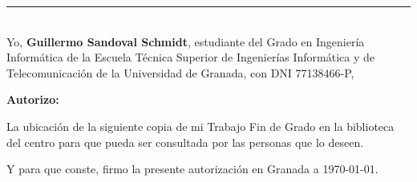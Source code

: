 \thispagestyle{empty}

\noindent\rule[-1ex]{\textwidth}{1pt}\\[4.5ex]

Yo, \textbf{Guillermo Sandoval Schmidt}, estudiante del Grado en Ingeniería Informática de la Escuela Técnica Superior de Ingenierías Informática y de Telecomunicación de la Universidad de Granada, con DNI
77138466-P,

\vspace{0.5cm}

\textbf{Autorizo:}

\vspace{0.5cm}

La ubicación de la siguiente copia de mi Trabajo Fin de Grado en la biblioteca del centro para que pueda ser consultada por las personas que lo deseen.

\vspace{0.5cm}

Y para que conste, firmo la presente autorización en Granada a \today.